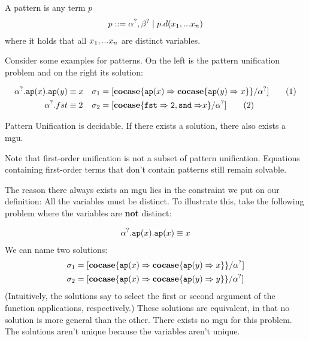 \documentclass[twoside,12pt,a4paper]{article}
\begin{document}
\begin{definition}[Pattern]
    A pattern is any term $p$ 
    \begin{align*}
        p ::= \alpha^?, \beta^? \;|\; p.d(x_1,...x_n)
    \end{align*}
    where it holds that all $x_1,...x_n$ are distinct variables.
\end{definition}

Consider some examples for patterns. On the left is the pattern unification problem and on the right its solution:
\begin{example}[Pattern]
    \begin{align*}
        \alpha^?.\texttt{ap}(x).\texttt{ap}(y)&\equiv x &\sigma_1 &= [\textbf{cocase}\{\texttt{ap}(x)\Rightarrow\textbf{cocase}\{\texttt{ap}(y)\Rightarrow x\}\}/\alpha^?] \tag{1}\\
        \alpha^?.fst &\equiv 2 &\sigma_2 &= [\textbf{cocase}\{\mathtt{fst\Rightarrow 2, snd \Rightarrow}x\}/\alpha^?] \tag{2}
    \end{align*}   
\end{example}

\begin{theorem}
    Pattern Unification is decidable. If there exists a solution, there also exists a mgu.
\end{theorem}

Note that first-order unification is not a subset of pattern unification. 
Equations containing first-order terms that don't contain patterns still remain solvable.

The reason there always exists an mgu lies in the constraint we put on our definition: All the variables must be distinct. 
To illustrate this, take the following problem where the variables are \textbf{not} distinct:
\begin{example}
    \begin{align*}
        \alpha^?.\texttt{ap}(x).\texttt{ap}(x)\equiv x
    \end{align*}  
    We can name two solutions:
\begin{align*}
    \sigma_1 &= [\textbf{cocase}\{\texttt{ap}(x)\Rightarrow \textbf{cocase}\{\texttt{ap}(y)\Rightarrow x\}\}/\alpha^?]\\
    \sigma_2 &=[\textbf{cocase}\{\texttt{ap}(x)\Rightarrow \textbf{cocase}\{\texttt{ap}(y)\Rightarrow y\}\}/\alpha^?]  
\end{align*}
(Intuitively, the solutions say to select the first or second argument of the function applications, respectively.)
These solutions are equivalent, in that no solution is more general than the other. There exists no mgu for this problem.
The solutions aren't unique because the variables aren't unique.  
\end{example}
\end{document}
